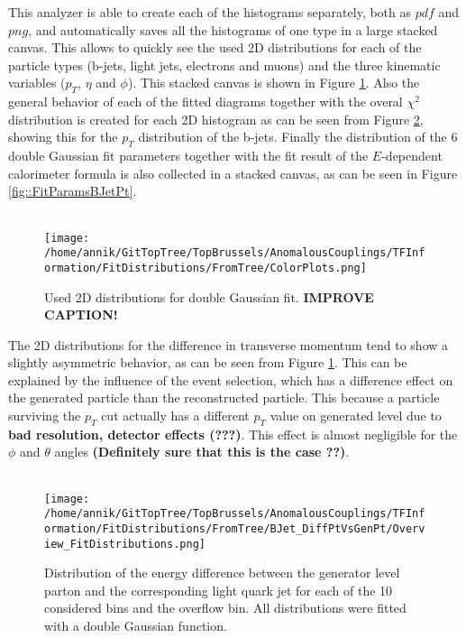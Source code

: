 This analyzer is able to create each of the histograms separately, both as $pdf$ and $png$, and automatically saves all the histograms of one type in a large stacked canvas. This allows to quickly see the used 2D distributions for each of the particle types (b-jets, light jets, electrons and muons) and the three kinematic variables ($p_T$, $\eta$ and $\phi$). This stacked canvas is shown in Figure \ref{fig::ColorPlots}.  Also the general behavior of each of the fitted diagrams together with the overal $\chi^{2}$ distribution is created for each 2D histogram as can be seen from Figure \ref{fig::StackedHistoBJetPt}, showing this for the $p_T$ distribution of the b-jets. Finally the distribution of the $6$ double Gaussian fit parameters together with the fit result of the $E$-dependent calorimeter formula is also collected in a stacked canvas, as can be seen in Figure \ref{fig::FitParamsBJetPt}.\\
\\
\begin{figure}[!h]
  \centering
  \texttt{[image: /home/annik/GitTopTree/TopBrussels/AnomalousCouplings/TFInformation/FitDistributions/FromTree/ColorPlots.png]}
  \caption{Used 2D distributions for double Gaussian fit. \textbf{IMPROVE CAPTION!}} \label{fig::ColorPlots} 
\end{figure}
The 2D distributions for the difference in transverse momentum tend to show a slightly asymmetric behavior, as can be seen from Figure \ref{fig::ColorPlots}. This can be explained by the influence of the event selection, which has a difference effect on the generated particle than the reconstructed particle. This because a particle surviving the $p_T$ cut actually has a different $p_T$ value on generated level due to \textbf{bad resolution, detector effects (???)}. This effect is almost negligible for the $\phi$ and $\theta$ angles \textbf{(Definitely sure that this is the case ??)}.\\
\\
\begin{figure}[!h]
  \centering
  \texttt{[image: /home/annik/GitTopTree/TopBrussels/AnomalousCouplings/TFInformation/FitDistributions/FromTree/BJet\_DiffPtVsGenPt/Overview\_FitDistributions.png]}
  \caption{Distribution of the energy difference between the generator level parton and the corresponding light quark jet for each of the 10 considered bins and the overflow bin. All distributions were fitted with a double Gaussian function.} \label{fig::StackedHistoBJetPt}
\end{figure}

